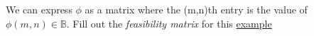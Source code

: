We can express $\phi$ as a matrix where the (m,n)th entry is the value of $\phi(m,n) \in \mathbb{B}$. Fill out the \emph{feasibility matrix} for this \href{doc/1 math/Seven Sketches in Compositionality/Chapter 4: Co-design/2 Enriched profunctors/2 V-profunctors/2 Bool-profunctors}{example}